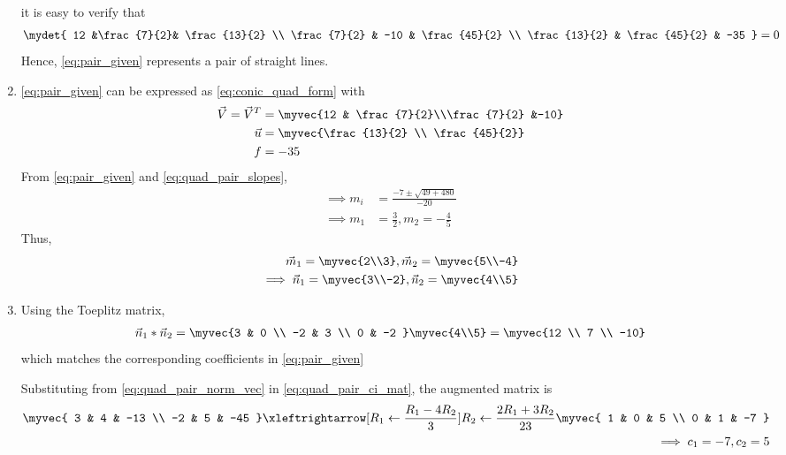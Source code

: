 \begin{enumerate}[label=\thesection.\arabic*.,ref=\thesection.\theenumi]
it is easy to verify that
\begin{align}
\mydet{
12 &\frac{7}{2}& \frac{13}{2}
\\
\frac{7}{2} & -10 & \frac{45}{2}
\\ 
\frac{13}{2} & \frac{45}{2} & -35
} = 0
\end{align}
%
Hence, \eqref{eq:pair_given} represents a pair of straight lines.

\item  \eqref{eq:pair_given} can be expressed as \eqref{eq:conic_quad_form} with
\begin{align}
    \vec{V}=\vec{V}^T&=\myvec{12 & \frac{7}{2}\\\frac{7}{2} &-10}\label{eq:pair_v}\\
    \vec{u}&=\myvec{\frac{13}{2} \\ \frac{45}{2}}\label{eq:pair_u}\\
    f&=-35\label{eq:pair_fv}
\end{align}
From \eqref{eq:pair_given} and \eqref{eq:quad_pair_slopes},
\begin{align}
\label{eq:quad_pair_slopes_ex}
\implies m_i &= \frac{-7 \pm \sqrt{49+480}}{-20}
\\
\implies m_1 &=  \frac{3}{2}, m_2 = -\frac{4}{5}
\end{align}
Thus,
\begin{align}
\vec{m}_1 = \myvec{2\\3},
\vec{m}_2 = \myvec{5\\-4}
\\
\implies
\vec{n}_1 = \myvec{3\\-2},
\vec{n}_2 = \myvec{4\\5}
\label{eq:quad_pair_norm_vec}
\end{align}
\item  Using the Toeplitz matrix,
\begin{align}
\vec{n}_1*\vec{n}_2 = 
\myvec{3 & 0
\\
-2 & 3
\\
0 & -2
}
\myvec{4\\5}
= \myvec{12 \\ 7 \\ -10}
\end{align}
%
which matches the corresponding coefficients in \eqref{eq:pair_given}

 Substituting from \eqref{eq:quad_pair_norm_vec}
in 
\eqref{eq:quad_pair_ci_mat}, 
the augmented matrix is
\begin{align}
\myvec{
3 & 4 & -13
\\
-2 & 5 & -45
}
\xleftrightarrow[R_1 \leftarrow \frac{R_1 - 4R_2}{3}]{R_2 \leftarrow \frac{2R_1 + 3R_2}{23}}
\myvec{
1 & 0 & 5
\\
0 & 1 & -7
}
\\
\implies c_1 = -7, c_2 = 5
\end{align}


\end{enumerate}
